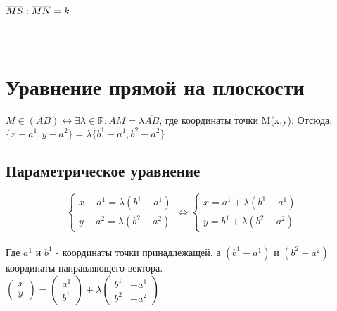 \documentclass{book}
\begin{document}
\paragraph{$\overline{MS}:\overline{MN}=k\\$}
\\
\chapter{Уравнение прямой на плоскости}
$M \in (AB) \longleftrightarrow \exists \lambda \in \mathbb{R} : AM = \lambda\overline{AB}$, где координаты точки M(x,y).
Отсюда: $\{x-a^1,y-a^2\}=\lambda\{b^1-a^1,b^2-a^2\}$
\begin{figure}[h!]
\end{figure}
\section{Параметрическое уравнение}

\begin{equation}
    \begin{cases}
      x-a^1=\lambda(b^1-a^1)\\
      y-a^2=\lambda(b^2-a^2)
    \end{cases}
\Leftrightarrow
    \begin{cases}
      x=a^1+\lambda(b^1-a^1)\\
      y=b^1+\lambda(b^2-a^2) 
    \end{cases}
\end{equation}\\

Где $a^1$ и $b^1$ - координаты точки принадлежащей, а $(b^1-a^1)$ и $(b^2-a^2)$ координаты направляющего вектора.\\
$
    \begin{pmatrix}
        {x}\\
        {y}
    \end{pmatrix}
 = 
\begin{pmatrix}
    {a^1}\\
    {b^1}
\end{pmatrix} + \lambda
\begin{pmatrix}
    {b^1} & {-a^1}\\
    {b^2} & {-a^2}
\end{pmatrix}$\\
\end{document}
